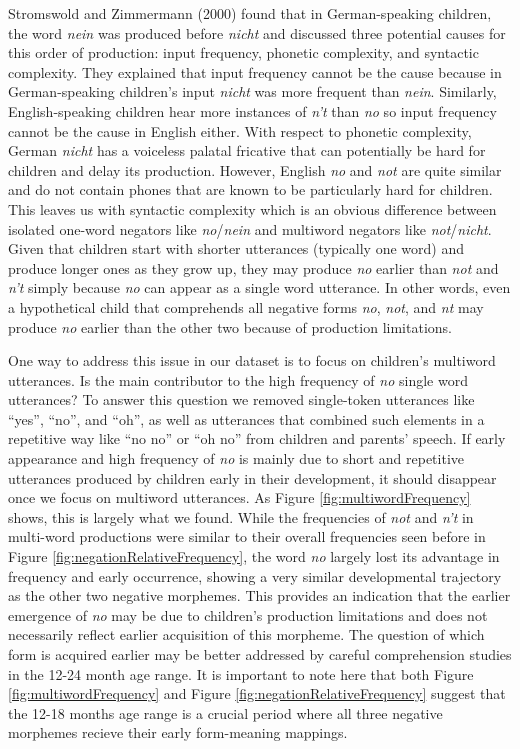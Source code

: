 \documentclass[man,floatsintext,draftall]{apa6}
\begin{document}
Stromswold and Zimmermann (2000) found that in German-speaking children, the word \emph{nein} was produced before \emph{nicht} and discussed three potential causes for this order of production: input frequency, phonetic complexity, and syntactic complexity. They explained that input frequency cannot be the cause because in German-speaking children's input \emph{nicht} was more frequent than \emph{nein}. Similarly, English-speaking children hear more instances of \emph{n't} than \emph{no} so input frequency cannot be the cause in English either. With respect to phonetic complexity, German \emph{nicht} has a voiceless palatal fricative that can potentially be hard for children and delay its production. However, English \emph{no} and \emph{not} are quite similar and do not contain phones that are known to be particularly hard for children. This leaves us with syntactic complexity which is an obvious difference between isolated one-word negators like \emph{no}/\emph{nein} and multiword negators like \emph{not}/\emph{nicht}. Given that children start with shorter utterances (typically one word) and produce longer ones as they grow up, they may produce \emph{no} earlier than \emph{not} and \emph{n't} simply because \emph{no} can appear as a single word utterance. In other words, even a hypothetical child that comprehends all negative forms \emph{no}, \emph{not}, and \emph{nt} may produce \emph{no} earlier than the other two because of production limitations.

One way to address this issue in our dataset is to focus on children's multiword utterances. Is the main contributor to the high frequency of \emph{no} single word utterances? To answer this question we removed single-token utterances like \enquote{yes}, \enquote{no}, and \enquote{oh}, as well as utterances that combined such elements in a repetitive way like \enquote{no no} or \enquote{oh no} from children and parents' speech. If early appearance and high frequency of \emph{no} is mainly due to short and repetitive utterances produced by children early in their development, it should disappear once we focus on multiword utterances. As Figure \ref{fig:multiwordFrequency} shows, this is largely what we found. While the frequencies of \emph{not} and \emph{n't} in multi-word productions were similar to their overall frequencies seen before in Figure \ref{fig:negationRelativeFrequency}, the word \emph{no} largely lost its advantage in frequency and early occurrence, showing a very similar developmental trajectory as the other two negative morphemes. This provides an indication that the earlier emergence of \emph{no} may be due to children's production limitations and does not necessarily reflect earlier acquisition of this morpheme. The question of which form is acquired earlier may be better addressed by careful comprehension studies in the 12-24 month age range. It is important to note here that both Figure \ref{fig:multiwordFrequency} and Figure \ref{fig:negationRelativeFrequency} suggest that the 12-18 months age range is a crucial period where all three negative morphemes recieve their early form-meaning mappings.
\end{document}
